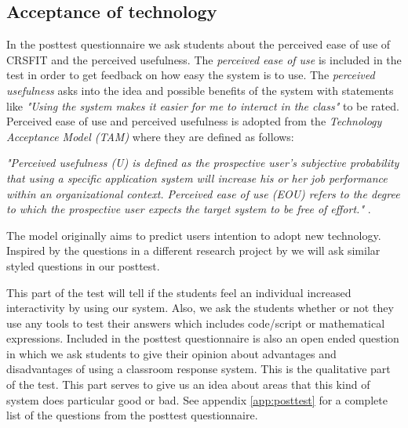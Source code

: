 \subsection{Acceptance of technology}
In the posttest questionnaire we ask students about the perceived ease of use of CRSFIT and the perceived usefulness. The \emph{perceived ease of use} is included in the test in order to get feedback on how easy the system is to use. The \emph{perceived usefulness} asks into the idea and possible benefits of the system with statements like \emph{"Using the system makes it easier for me to interact in the class"} to be rated. Perceived ease of use and perceived usefulness is adopted from the \emph{Technology Acceptance Model (TAM)} \cite{siau2006use,davis1989user} where they are defined as follows:

\emph{"Perceived usefulness (U) is defined as the prospective user's subjective probability that using a specific application system will increase his or her job performance within an organizational context. Perceived ease of use (EOU) refers to the degree to which the prospective user expects the target system to be free of effort."} \cite[p.~985]{davis1989user}.

The model originally aims to predict users intention to adopt new technology. Inspired by the questions in a different research project by  we will ask similar styled questions in our posttest.

This part of the test will tell if the students feel an individual increased interactivity by using our system. Also, we ask the students whether or not they use any tools to test their answers which includes code/script or mathematical expressions. Included in the posttest questionnaire is also an open ended question in which we ask students to give their opinion about advantages and disadvantages of using a classroom response system. This is the qualitative part of the test. This part serves to give us an idea about areas that this kind of system does particular good or bad. See appendix \ref{app:posttest} for a complete list of the questions from the posttest questionnaire.


